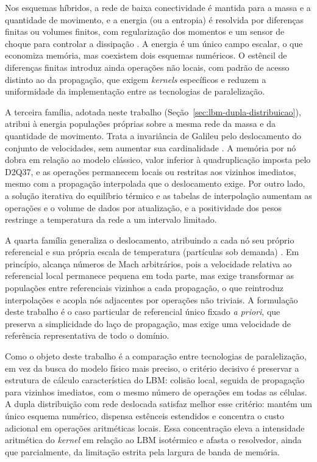 Nos esquemas híbridos, a rede de baixa conectividade é mantida para a massa e a quantidade de movimento, e a energia (ou a entropia) é resolvida por diferenças finitas ou volumes finitos, com regularização dos momentos e um sensor de choque para controlar a dissipação \parencite{Feng2019, Guo2020}.
A energia é um único campo escalar, o que economiza memória, mas coexistem dois esquemas numéricos.
O estêncil de diferenças finitas introduz ainda operações não locais, com padrão de acesso distinto ao da propagação, que exigem \textit{kernels} específicos e reduzem a uniformidade da implementação entre as tecnologias de paralelização.

A terceira família, adotada neste trabalho (Seção~\ref{sec:lbm-dupla-distribuicao}), atribui à energia populações próprias sobre a mesma rede da massa e da quantidade de movimento.
Trata a invariância de Galileu pelo deslocamento do conjunto de velocidades, sem aumentar sua cardinalidade \parencite{Tran2022}.
A memória por nó dobra em relação ao modelo clássico, valor inferior à quadruplicação imposta pelo D2Q37, e as operações permanecem locais ou restritas aos vizinhos imediatos, mesmo com a propagação interpolada que o deslocamento exige.
Por outro lado, a solução iterativa do equilíbrio térmico e as tabelas de interpolação aumentam as operações e o volume de dados por atualização, e a positividade dos pesos restringe a temperatura da rede a um intervalo limitado.

A quarta família generaliza o deslocamento, atribuindo a cada nó seu próprio referencial e sua própria escala de temperatura (partículas sob demanda) \parencite{Dorschner2018}.
Em princípio, alcança números de Mach arbitrários, pois a velocidade relativa ao referencial local permanece pequena em toda parte, mas exige transformar as populações entre referenciais vizinhos a cada propagação, o que reintroduz interpolações e acopla nós adjacentes por operações não triviais.
A formulação deste trabalho é o caso particular de referencial único fixado \textit{a priori}, que preserva a simplicidade do laço de propagação, mas exige uma velocidade de referência representativa de todo o domínio.

Como o objeto deste trabalho é a comparação entre tecnologias de paralelização, em vez da busca do modelo físico mais preciso, o critério decisivo é preservar a estrutura de cálculo característica do LBM: colisão local, seguida de propagação para vizinhos imediatos, com o mesmo número de operações em todas as células.
A dupla distribuição com rede deslocada satisfaz melhor esse critério: mantém um único esquema numérico, dispensa estênceis estendidos e concentra o custo adicional em operações aritméticas locais.
Essa concentração eleva a intensidade aritmética do \textit{kernel} em relação ao LBM isotérmico e afasta o resolvedor, ainda que parcialmente, da limitação estrita pela largura de banda de memória.


